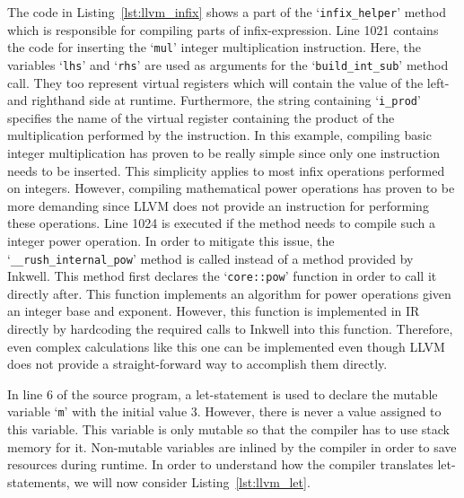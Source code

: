 
The code in Listing~\ref{lst:llvm_infix} shows a part of the `\Verb|infix_helper|' method which is responsible for compiling parts of infix-expression.
Line 1021 contains the code for inserting the `\texttt{mul}' integer multiplication instruction.
Here, the variables `\texttt{lhs}' and `\texttt{rhs}' are used as arguments for the `\Verb|build_int_sub|' method call.
They too represent virtual registers which will contain the value of the left- and righthand side at runtime.
Furthermore, the string containing `\Verb|i_prod|' specifies the name of the virtual register containing the product of the multiplication performed by the instruction.
In this example, compiling basic integer multiplication has proven to be really simple since only one instruction needs to be inserted.
This simplicity applies to most infix operations performed on integers.
However, compiling mathematical power operations has proven to be more demanding since LLVM does not provide an instruction for performing these operations.
Line 1024 is executed if the method needs to compile such a integer power operation.
In order to mitigate this issue, the `\Verb|__rush_internal_pow|' method is called instead of a method provided by Inkwell.
This method first declares the `\Verb|core::pow|' function in order to call it directly after.
This function implements an algorithm for power operations given an integer base and exponent.
However, this function is implemented in IR directly by hardcoding the required calls to Inkwell into this function.
Therefore, even complex calculations like this one can be implemented even though LLVM does not provide a straight-forward way to accomplish them directly.

In line 6 of the source program, a let-statement is used to declare the mutable variable `\texttt{m}' with the initial value 3.
However, there is never a value assigned to this variable.
This variable is only mutable so that the compiler has to use stack memory for it.
Non-mutable variables are inlined by the compiler in order to save resources during runtime.
In order to understand how the compiler translates let-statements, we will now consider Listing~\ref{lst:llvm_let}.


